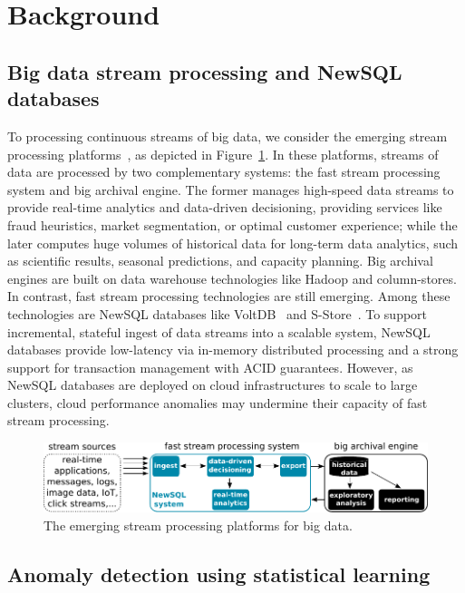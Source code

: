 \section{Background}
\label{sec:background}


\subsection{Big data stream processing and NewSQL databases}

To processing continuous streams of big data, we consider the emerging stream processing platforms~\cite{leskovec2014mining}, as depicted in Figure~\ref{fig:newsql_data_stream}. In these platforms, streams of data are processed by two complementary systems: the fast stream processing system and big archival engine. The former manages high-speed data streams to provide real-time analytics and data-driven decisioning, providing services like fraud heuristics, market segmentation, or optimal customer experience; while the later computes huge volumes of historical data for long-term data analytics, such as scientific results, seasonal predictions, and capacity planning. Big archival engines are built on data warehouse technologies like Hadoop and column-stores. In contrast, fast stream processing technologies are still emerging. Among these technologies are NewSQL databases like VoltDB~\cite{stonebraker2013voltdb} and S-Store~\cite{cetintemel2014s}. To support incremental, stateful ingest of data streams into a scalable system, NewSQL databases provide low-latency via in-memory distributed processing and a strong support for transaction management with ACID guarantees. However, as NewSQL databases are deployed on cloud infrastructures to scale to large clusters, cloud performance anomalies may undermine their capacity of fast stream processing.

\begin{figure}[!h]
  \centering
     \includegraphics[width=.8\textwidth]{inputs/img/simple_newsql_data_stream}
  \caption{The emerging stream processing platforms for big data.}
  \label{fig:newsql_data_stream}
\end{figure}

\subsection{Anomaly detection using statistical learning}
\label{subsec:anomaly}

